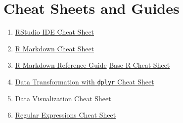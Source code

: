\documentclass[]{book}
\begin{document}
\hypertarget{cheat-sheets-and-guides}{%
\chapter{Cheat Sheets and Guides}\label{cheat-sheets-and-guides}}

\begin{enumerate}
\def\labelenumi{\arabic{enumi}.}
\item
  \href{https://github.com/rstudio/cheatsheets/raw/master/rstudio-ide.pdf}{RStudio IDE Cheat Sheet}
\item
  \href{https://github.com/rstudio/cheatsheets/raw/master/rmarkdown-2.0.pdf}{R Markdown Cheat Sheet}
\item
  \href{https://www.rstudio.com/wp-content/uploads/2015/03/rmarkdown-reference.pdf}{R Markdown Reference Guide}
  \href{http://github.com/rstudio/cheatsheets/raw/master/base-r.pdf}{Base R Cheat Sheet}
\item
  \href{https://github.com/rstudio/cheatsheets/raw/master/data-transformation.pdf}{Data Transformation with \texttt{dplyr} Cheat Sheet}
\item
  \href{https://github.com/rstudio/cheatsheets/raw/master/data-visualization-2.1.pdf}{Data Visualization Cheat Sheet}
\item
  \href{https://github.com/rstudio/cheatsheets/raw/master/regex.pdf}{Regular Expressions Cheat Sheet}
\end{enumerate}
\end{document}

